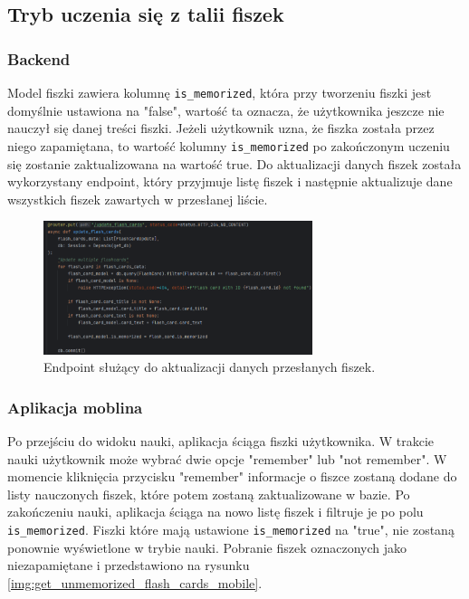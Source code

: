 \subsection{Tryb uczenia się z talii fiszek}

\subsubsection{Backend}

Model fiszki zawiera kolumnę \texttt{is\_memorized}, która przy tworzeniu fiszki jest domyślnie ustawiona na "false", wartość ta oznacza, że użytkownika jeszcze nie nauczył się danej treści fiszki. Jeżeli użytkownik uzna, że fiszka została przez niego zapamiętana, to wartość kolumny \texttt{is\_memorized} po zakończonym uczeniu się zostanie zaktualizowana na wartość true. Do aktualizacji danych fiszek została wykorzystany endpoint, który przyjmuje listę fiszek i następnie aktualizuje dane wszystkich fiszek zawartych w przesłanej liście.

\begin{figure}[H]
    \centering
    \includegraphics[width=0.7\textwidth]{chapters/chapter_8/screens/update_flash_card_memorized_backend}
    \caption{Endpoint służący do aktualizacji danych przesłanych fiszek.}
    \label{img:update_flash_card_memorized_backend}
\end{figure}

\subsubsection{Aplikacja moblina}

Po przejściu do widoku nauki, aplikacja ściąga fiszki użytkownika. W trakcie nauki użytkownik może wybrać dwie opcje "remember" lub "not remember". W momencie kliknięcia przycisku "remember" informacje o fiszce zostaną dodane do listy nauczonych fiszek, które potem zostaną zaktualizowane w bazie. Po zakończeniu nauki, aplikacja ściąga na nowo listę fiszek i filtruje je po polu \texttt{is\_memorized}. Fiszki które mają ustawione \texttt{is\_memorized} na "true", nie zostaną ponownie wyświetlone w trybie nauki. Pobranie fiszek oznaczonych jako niezapamiętane i przedstawiono na rysunku \ref{img:get_unmemorized_flash_cards_mobile}.

